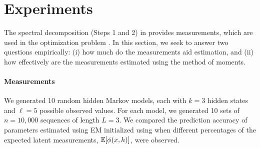 \section{Experiments} \label{sec:experiments}

The spectral decomposition (Steps 1 and 2) in 
provides measurements,
which are used in the optimization problem .
In this section, we
seek to answer two questions empirically:
(i) how much do the measurements aid estimation, and
(ii) how effectively are the measurements estimated using the
method of moments.

\paragraph{Measurements}

We generated 10 random hidden Markov models,
each with $k=3$ hidden states and $\ell=5$ possible observed values. 
For each model, we generated 10 sets of $n=10,000$ sequences of length $L=3$.
We compared the prediction accuracy of parameters estimated using EM
initialized using  when different percentages of the expected
latent measurements, $\mathbb{E}[\phi(x,h)]$, were observed.


